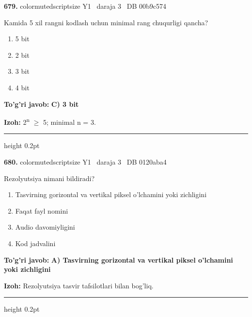 \documentclass[10pt,a4paper,oneside]{article}
\begin{document}
\noindent\textbf{\color{ink}679.}  {color{muted}scriptsize Y1 \textbullet\ daraja 3 \textbullet\ DB 00b9c574}
\par
Kamida 5 xil rangni kodlash uchun minimal rang chuqurligi qancha?
\begin{enumerate}[label=\Alph*),leftmargin=9mm]
\item 5 bit
\item 2 bit
\item 3 bit
\item 4 bit
\end{enumerate}
\begin{tcolorbox}[enhanced,breakable,colback=teal!4,colframe=teal!50!black,boxrule=0.5pt,arc=1.1mm,left=3mm,right=3mm,top=1.7mm,bottom=1.7mm,before skip=2mm,after skip=2mm]
\textbf{\color{teal}To'g'ri javob:} \textbf{C) 3 bit}
\par\smallskip
\textbf{Izoh:} 2\textsuperscript{n} \ensuremath{\geq} 5; minimal n = 3.
\end{tcolorbox}
\vspace{2mm}\hrule height 0.2pt \vspace{3mm}

\noindent\textbf{\color{ink}680.}  {color{muted}scriptsize Y1 \textbullet\ daraja 3 \textbullet\ DB 0120aba4}
\par
Rezolyutsiya nimani bildiradi?
\begin{enumerate}[label=\Alph*),leftmargin=9mm]
\item Tasvirning gorizontal va vertikal piksel o'lchamini yoki zichligini
\item Faqat fayl nomini
\item Audio davomiyligini
\item Kod jadvalini
\end{enumerate}
\begin{tcolorbox}[enhanced,breakable,colback=teal!4,colframe=teal!50!black,boxrule=0.5pt,arc=1.1mm,left=3mm,right=3mm,top=1.7mm,bottom=1.7mm,before skip=2mm,after skip=2mm]
\textbf{\color{teal}To'g'ri javob:} \textbf{A) Tasvirning gorizontal va vertikal piksel o'lchamini yoki zichligini}
\par\smallskip
\textbf{Izoh:} Rezolyutsiya tasvir tafsilotlari bilan bog'liq.
\end{tcolorbox}
\vspace{2mm}\hrule height 0.2pt \vspace{3mm}
\end{document}
